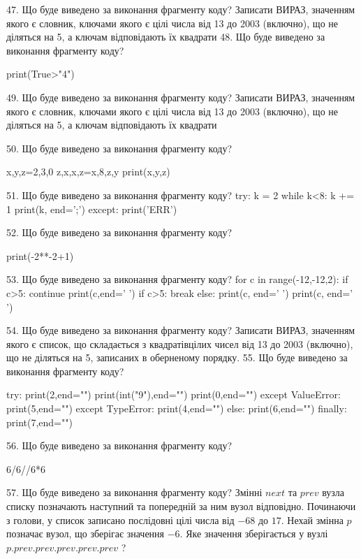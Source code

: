\documentclass[11pt]{article}
\begin{document}
47. Що буде виведено за виконання фрагменту коду?
Записати ВИРАЗ, значенням якого є словник, ключами якого є цілі числа від 13 до 2003 (включно), що не діляться на 5, а ключам відповідають їх квадрати 
48. Що буде виведено за виконання фрагменту коду?

print(True>"4")

49. Що буде виведено за виконання фрагменту коду?
Записати ВИРАЗ, значенням якого є словник, ключами якого є цілі числа від 13 до 2003 (включно), що не діляться на 5, а ключам відповідають їх квадрати 

50. Що буде виведено за виконання фрагменту коду?

x,y,z=2,3,0
z,x,x,z=x,8,z,y
print(x,y,z)

51. Що буде виведено за виконання фрагменту коду?
try:
    k = 2
    while k<8:
        k += 1
    print(k, end=';')
except:
    print('ERR')

52. Що буде виведено за виконання фрагменту коду?

print(-2**-2+1)

53. Що буде виведено за виконання фрагменту коду?
for c in range(-12,-12,2):
    if c>5:
        continue
        print(c,end=' ')
    if c>5:
        break
else:
    print(c, end=' ')
print(c, end=' ')

54. Що буде виведено за виконання фрагменту коду?
Записати ВИРАЗ, значенням якого є список, що складається з квадратівцілих чисел від 13 до 2003 (включно), що не діляться на 5, записаних в оберненому порядку.
55. Що буде виведено за виконання фрагменту коду?

try:
    print(2,end="")
    print(int("9"),end="")
    print(0,end="")
except ValueError: print(5,end="")
except TypeError: print(4,end="")
else: print(6,end="")
finally: print(7,end="")


56. Що буде виведено за виконання фрагменту коду?

6/6//6*6

57. Що буде виведено за виконання фрагменту коду?
Змінні $next$ та $prev$ вузла списку позначають наступний та попередній за ним вузол відповідно. Починаючи з голови, у список записано послідовні цілі числа від $-68$ до $17$. Нехай змінна $p$ позначає вузол, що зберігає значення $-6$.
Яке значення зберігається у вузлі $p.prev.prev.prev.prev.prev$ ?
\end{document}

